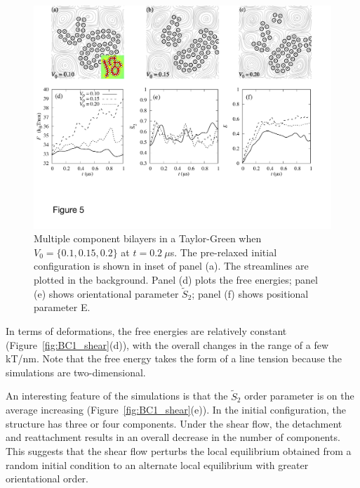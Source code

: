 \documentclass[aps,prl,preprint,groupedaddress]{revtex4-2}
\begin{document}
\begin{figure}
  \begin{center}
    \includegraphics[width=1.0\textwidth]{Figures/Figure5.pdf}    
  \end{center}
  \vspace{-20pt}  
  \caption{\label{fig:BC1_TG} Multiple component bilayers in a Taylor-Green when $V_0 = \{0.1, 0.15, 0.2\}$ at $t=0.2\ \mu$s. The pre-relaxed initial configuration is shown in inset of panel (a). 
 The streamlines are plotted in the background. 
Panel (d) plots the free energies; panel (e) shows orientational parameter $\tilde{S}_2$; panel (f) shows positional parameter E.
  }
\end{figure}

In terms of deformations, 
the free energies 
are relatively constant (Figure~\ref{fig:BC1_shear}(d)),
with the overall changes in the range of a few kT/nm.  Note that the free energy takes
the form of a line tension because the simulations are two-dimensional.

An interesting feature of the simulations is that the $\tilde S_2$ order parameter
is on the average increasing (Figure~\ref{fig:BC1_shear}(e)).  In the initial configuration,
the structure has three or four components.  Under the shear flow, the detachment and reattachment
results in an overall decrease in the number of components.  This suggests that
the shear flow perturbs the local equilibrium obtained from a random initial condition
to an alternate local equilibrium with greater orientational order.   
\end{document}
